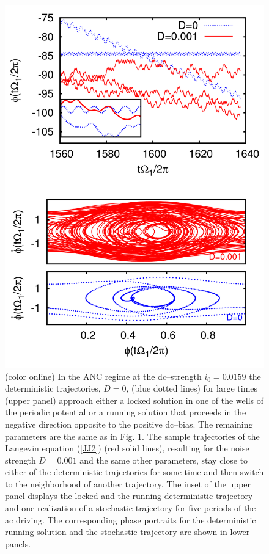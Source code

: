 \documentclass[a4,twocolumn,showpacs,showkeys]{revtex4}
\begin{document}
\begin{figure}
\includegraphics[width=1\linewidth]{fig2}
\caption{(color online) 
In the ANC regime at the dc--strength $i_{0}=0.0159$ the
deterministic trajectories, $D=0$,  (blue dotted lines) for large times (upper
panel)  approach  
either a locked solution in one of the wells of the periodic potential
or a running solution that proceeds in the negative direction opposite
to the positive dc--bias. The remaining parameters are the same as in
Fig. 1. The sample trajectories of the Langevin equation (\ref{JJ2})
(red solid lines), resulting for the noise strength $D= 0.001$ and the
same other parameters, stay close to either of the deterministic
trajectories for some time  and then switch to the neighborhood of
another trajectory. The inset of the upper panel displays the locked and the running
deterministic trajectory and one realization of a stochastic
trajectory for five periods of the ac driving.   The corresponding phase portraits for the  deterministic running solution and the stochastic trajectory are shown in lower panels.  
}
\label{fig2}
\end{figure}
\end{document}
